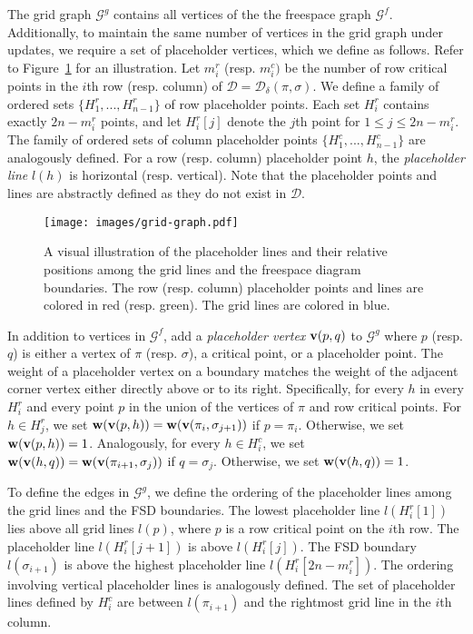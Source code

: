\documentclass[thm-restate]{lipics-v2021}
\theoremstyle{remark}
\newcommand{\weight}[1]{\normalfont \textbf{w}(#1)}
\newcommand{\graph}[0]{\mathcal{G}}
\newcommand{\fd}[2]{\mathcal{D}_{#2}(#1)}
\newcommand{\D}{\mathcal{D}}
\newcommand{\vertex}[1]{\normalfont \textbf{v}(#1)}
\newcommand{\fsgraph}[0]{\graph^{f}}
\newcommand{\ggraph}[0]{\graph^g}
\begin{document}
The grid graph $\ggraph$ contains all vertices of the the freespace graph $\fsgraph$. Additionally, to maintain the same number of vertices in the grid graph under updates, we require a set of placeholder vertices, which we define as follows. Refer to Figure~\ref{fig:grid-graph} for an illustration. Let $m^r_i$ (resp. $m^c_i)$ be the number of row critical points in the $i$th row (resp. column) of $\D = \fd{\pi, \sigma}{\delta}$. We define a family of ordered sets $\{H^r_1, ..., H^r_{n - 1}\}$ of row placeholder points. Each set $H^r_i$ contains exactly $2n - m^r_i$ points, and let $H^r_i[j]$ denote the $j$th point for $1 \leq j \leq 2n - m^r_i$. The family of ordered sets of column placeholder points $\{H^c_1, ..., H^c_{n - 1}\}$ are analogously defined. For a row (resp. column) placeholder point $h$, the \emph{placeholder line} $l(h)$ is horizontal (resp. vertical). Note that the placeholder points and lines are abstractly defined as they do not exist in $\D$. 

\begin{figure}[tbh]
    \centering
    \texttt{[image: images/grid-graph.pdf]}
    \caption{A visual illustration of the placeholder lines and their relative positions among the grid lines and the freespace diagram boundaries. The row (resp. column) placeholder points and lines are colored in red (resp. green). The grid lines are colored in blue.}
    \label{fig:grid-graph}
\end{figure}

In addition to vertices in $\fsgraph$, add a \emph{placeholder vertex} $\vertex{p, q}$ to $\ggraph$ where $p$ (resp. $q$) is either a vertex of $\pi$ (resp. $\sigma$), a critical point, or a placeholder point. The weight of a placeholder vertex on a boundary matches the weight of the adjacent corner vertex either directly above or to its right. Specifically, for every $h$ in every $H^r_i$ and every point $p$ in the union of the vertices of $\pi$ and row critical points. For $h \in H^r_j$, we set $\weight{\vertex{p, h}} = \weight{\vertex{\pi_i, \sigma_{j + 1}}}$ if $p = \pi_i$. Otherwise, we set $\weight{\vertex{p, h}} = 1$. Analogously, for every $h \in H^c_i$, we set $\weight{\vertex{h, q}} = \weight{\vertex{\pi_{i + 1}, \sigma_j}}$ if $q = \sigma_j$. Otherwise, we set $\weight{\vertex{h, q}} = 1$. 

To define the edges in $\ggraph$, we define the ordering of the placeholder lines among the grid lines and the FSD boundaries. The lowest placeholder line $l(H^r_i[1])$ lies above all grid lines $l(p)$, where $p$ is a row critical point on the $i$th row. The placeholder line $l(H^r_i[j + 1])$ is above $l(H^r_i[j])$. The FSD boundary $l(\sigma_{i + 1})$ is above the highest placeholder line $l(H^r_i[2n - m_i^r])$. The ordering involving vertical placeholder lines is analogously defined. The set of placeholder lines defined by $H^c_i$ are between $l(\pi_{i + 1})$ and the rightmost grid line in the $i$th column. 
\end{document}
